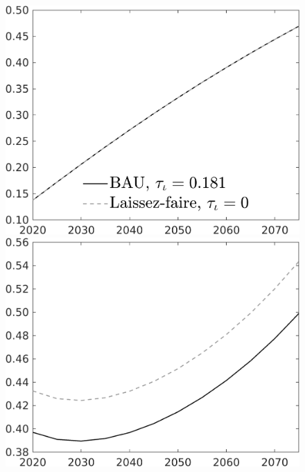 \documentclass[12pt]{article}
\begin{document}
\begin{figure}[h!!]
\begin{minipage}[]{0.32\textwidth}
	\end{minipage}	
	\begin{minipage}[]{0.32\textwidth}
		\includegraphics[width=1\textwidth]{../../codding_model/own_basedOnFried/optimalPol_010922_revision/figures/all_13Sept22/CompTaul_Equlab_LFBAU_Reg0_GFF_spillover0_nsk1_xgr1_knspil0_sep1_countec0_GovRev0_etaa0.79_lgd1.png}
	\end{minipage}	
\begin{minipage}[]{0.32\textwidth}
\includegraphics[width=1\textwidth]{../../codding_model/own_basedOnFried/optimalPol_010922_revision/figures/all_13Sept22/CompTaul_Equlab_LFBAU_Reg0_F_spillover0_nsk1_xgr1_knspil0_sep1_countec0_GovRev0_etaa0.79_lgd0.png}

\end{minipage}
\end{figure}
\end{document}

